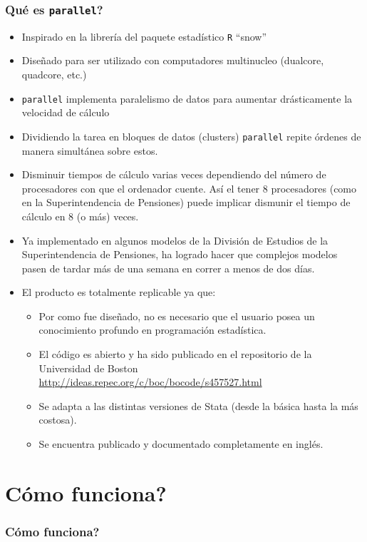 \documentclass{beamer}
\begin{document}
\begin{frame}[allowframebreaks=.8]
\frametitle{Qu\'e es {\tt parallel}?}

\begin{itemize}
\item Inspirado en la librer\'ia del paquete estad\'istico {\tt R} ``snow''
\item Dise\~nado para ser utilizado con computadores multinucleo (dualcore, quadcore, etc.)
\item {\tt parallel} implementa paralelismo de datos para aumentar dr\'asticamente la velocidad de c\'alculo
\item Dividiendo la tarea en bloques de datos (clusters) {\tt parallel} repite \'ordenes de manera simult\'anea sobre estos.
\item Disminuir tiempos de c\'alculo varias veces dependiendo del n\'umero de procesadores con que el ordenador cuente. Así el tener 8 procesadores (como en la Superintendencia de Pensiones) puede implicar dismunir el tiempo de c\'alculo en 8 (o m\'as) veces.
\item Ya implementado en algunos modelos de la Divisi\'on de Estudios de la Superintendencia de Pensiones, ha logrado hacer que complejos modelos pasen de tardar m\'as de una semana en correr a menos de dos días.
\item El producto es totalmente replicable ya que:
\begin{itemize}
\item Por como fue dise\~nado, no es necesario que el usuario posea un conocimiento profundo en programaci\'on estad\'istica.
\item El c\'odigo es abierto y ha sido publicado en el repositorio de la Universidad de Boston \url{http://ideas.repec.org/c/boc/bocode/s457527.html}
\item Se adapta a las distintas versiones de Stata (desde la b\'asica hasta la m\'as costosa).
\item Se encuentra publicado y documentado completamente en ingl\'es.
\end{itemize}
\end{itemize}

\end{frame}

\section{C\'omo funciona?}

\begin{frame}
\frametitle{C\'omo funciona?}
\begin{figure}
\centering
\scalebox{.65}{}
\end{figure}
\end{frame}
\end{document}
